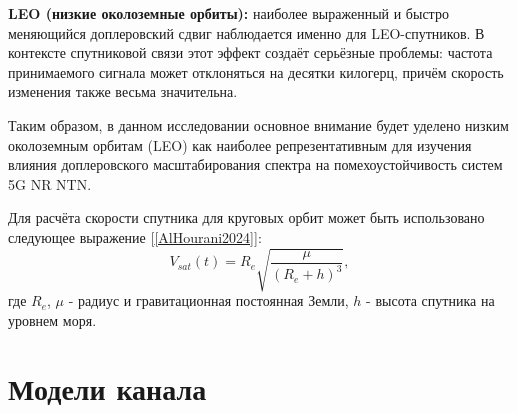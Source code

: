 \textbf{LEO (низкие околоземные орбиты):} наиболее выраженный и быстро меняющийся доплеровский сдвиг наблюдается
именно для LEO-спутников. В контексте спутниковой связи этот эффект создаёт серьёзные проблемы: 
частота принимаемого сигнала может отклоняться на десятки килогерц, причём скорость изменения также весьма значительна.

Таким образом, в данном исследовании основное внимание будет уделено низким околоземным орбитам (LEO) 
как наиболее репрезентативным для изучения влияния доплеровского масштабирования спектра 
на помехоустойчивость систем 5G NR NTN.

Для расчёта скорости спутника для круговых орбит может быть использовано следующее выражение [\ref{AlHourani2024}]:
\begin{equation}
    V_{sat}(t) = R_e \sqrt{\frac{\mu}{(R_e + h)^3}},
    \label{eq:sat_vel}
\end{equation}
\noindent где $R_e$, $\mu$ - радиус и гравитационная постоянная Земли, $h$ - высота спутника на уровнем моря.

\section{Модели канала}







